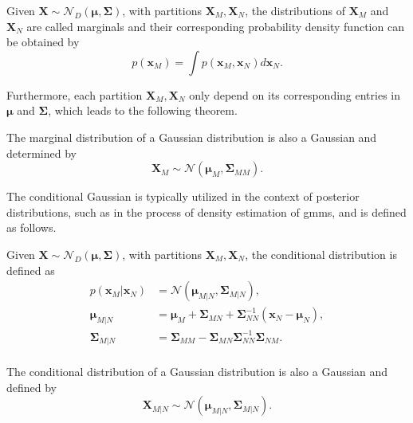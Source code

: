 \begin{definition}\label{def:marg_gaussian} \cite[p. 177]{dei_2020}
Given $\bm{X} \sim \mathcal{N}_D(\bm{\mu}, \bm{\Sigma})$, with partitions $\bm{X}_M, \bm{X}_N$, the distributions of $\bm{X}_M$ and $\bm{X}_N$ are called marginals and their corresponding probability density function can be obtained by
\begin{equation*}
    p(\bm{x}_M) = \int p(\bm{x}_M,\bm{x}_N)d\bm{x}_N.
\end{equation*}
\end{definition}

Furthermore, each partition $\bm{X}_M, \bm{X}_N$ only depend on its corresponding entries in $\bm{\mu}$ and  $\bm{\Sigma}$, which leads to the following theorem. 

\begin{theorem} \cite[p. 177]{dei_2020}
The marginal distribution of a Gaussian distribution is also a Gaussian and determined by
\begin{equation*}
    \bm{X}_M \sim \mathcal{N}(\bm{\mu}_M, \bm{\Sigma}_{MM}).
\end{equation*}
\end{theorem}

The conditional Gaussian is typically utilized in the context of posterior distributions, such as in the process of density estimation of \acrshort{gmm}s, and is defined as follows.

\begin{definition} \cite[p. 177]{dei_2020}
Given $\bm{X} \sim \mathcal{N}_D(\bm{\mu}, \bm{\Sigma})$, with partitions $\bm{X}_M, \bm{X}_N$, the conditional distribution is defined as
\begin{align*}
    p(\bm{x}_M | \bm{x}_N) &= \mathcal{N}(\bm{\mu}_{M | N}, \bm{\Sigma}_{M | N}), \\
    \bm{\mu}_{M | N} &= \bm{\mu}_M + \bm{\Sigma}_{M N} + \bm{\Sigma}^{-1}_{N N}(\bm{x}_N - \bm{\mu}_N),\\
    \bm{\Sigma}_{M | N} &= \bm{\Sigma}_{M M} - \bm{\Sigma}_{M N} \bm{\Sigma}^{-1}_{N N}\bm{\Sigma}_{N M}.\\
\end{align*}
\end{definition}

\begin{theorem} \cite[p. 177]{dei_2020}
The conditional distribution of a Gaussian distribution is also a Gaussian and defined by 
\begin{equation*}
    \bm{X}_{M | N} \sim \mathcal{N}(\bm{\mu}_{M | N}, \bm{\Sigma}_{M | N}).
\end{equation*}
\end{theorem}

